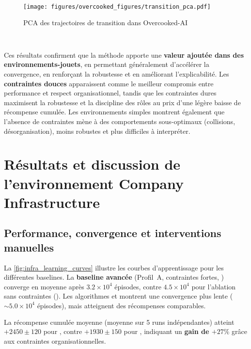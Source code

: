 \begin{figure}[h!]
  \centering
  \texttt{[image: figures/overcooked\_figures/transition\_pca.pdf]}
  \caption{PCA des trajectoires de transition dans Overcooked-AI}
  \label{fig:overcooked_pca}
\end{figure}

\

Ces résultats confirment que la méthode  apporte une \textbf{valeur ajoutée dans des environnements-jouets}, en permettant généralement d'accélérer la convergence, en renforçant la robustesse et en améliorant l'explicabilité.
Les \textbf{contraintes douces} apparaissent comme le meilleur compromis entre performance et respect organisationnel, tandis que les contraintes dures maximisent la robustesse et la discipline des rôles au prix d'une légère baisse de récompense cumulée.
Les environnements simples montrent également que l'absence de contraintes mène à des comportements sous-optimaux (collisions, désorganisation), moins robustes et plus difficiles à interpréter.

\section{Résultats et discussion de l'environnement Company Infrastructure}\label{sec:results_and_discussion_infra}

\subsection*{Performance, convergence et interventions manuelles}

La \autoref{fig:infra_learning_curves} illustre les courbes d'apprentissage pour les différentes baselines.
La \textbf{baseline avancée} (Profil~A, contraintes fortes, ) converge en moyenne après $3.2 \times 10^4$ épisodes, contre $4.5 \times 10^4$ pour l'ablation sans contraintes ().
Les algorithmes  et  montrent une convergence plus lente ($\sim 5.0 \times 10^4$ épisodes), mais atteignent des récompenses comparables.

La récompense cumulée moyenne (moyenne sur 5 runs indépendantes) atteint $+2450 \pm 120$ pour , contre $+1930 \pm 150$ pour , indiquant un \textbf{gain de $+27\%$} grâce aux contraintes organisationnelles.

